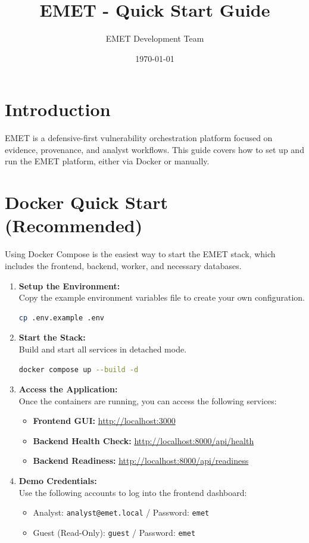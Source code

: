 \documentclass{article}
\title{\textbf{EMET - Quick Start Guide}}
\author{EMET Development Team}
\date{\today}
\begin{document}
\maketitle

\section*{Introduction}
EMET is a defensive-first vulnerability orchestration platform focused on evidence, provenance, and analyst workflows. This guide covers how to set up and run the EMET platform, either via Docker or manually.

\section{Docker Quick Start (Recommended)}

Using Docker Compose is the easiest way to start the EMET stack, which includes the frontend, backend, worker, and necessary databases.

\begin{enumerate}
    \item \textbf{Setup the Environment:}\\
    Copy the example environment variables file to create your own configuration.
    \begin{lstlisting}[language=bash, frame=single, backgroundcolor=\color{lightgray!20}]
cp .env.example .env
    \end{lstlisting}

    \item \textbf{Start the Stack:}\\
    Build and start all services in detached mode.
    \begin{lstlisting}[language=bash, frame=single, backgroundcolor=\color{lightgray!20}]
docker compose up --build -d
    \end{lstlisting}

    \item \textbf{Access the Application:}\\
    Once the containers are running, you can access the following services:
    \begin{itemize}
        \item \textbf{Frontend GUI:} \url{http://localhost:3000}
        \item \textbf{Backend Health Check:} \url{http://localhost:8000/api/health}
        \item \textbf{Backend Readiness:} \url{http://localhost:8000/api/readiness}
    \end{itemize}

    \item \textbf{Demo Credentials:}\\
    Use the following accounts to log into the frontend dashboard:
    \begin{itemize}
        \item Analyst: \texttt{analyst@emet.local} / Password: \texttt{emet}
        \item Guest (Read-Only): \texttt{guest} / Password: \texttt{emet}
    \end{itemize}
\end{enumerate}
\end{document}
